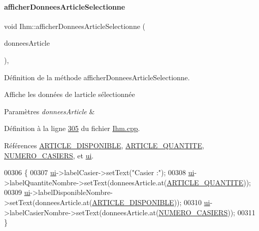 \paragraph{\texorpdfstring{afficher\+Donnees\+Article\+Selectionne}{afficherDonneesArticleSelectionne}\hspace{0.1cm}{\footnotesize\ttfamily [1/2]}}
{\footnotesize\ttfamily void Ihm\+::afficher\+Donnees\+Article\+Selectionne (\begin{DoxyParamCaption}\item[{Q\+String\+List}]{donnees\+Article }\end{DoxyParamCaption})\hspace{0.3cm}{\ttfamily [private]}, {\ttfamily [slot]}}



Définition de la méthode afficher\+Donnees\+Article\+Selectionne. 

Affiche les données de l\textquotesingle{}article sélectionnée 
\begin{DoxyParams}{Paramètres}
{\em donnees\+Article} & \\
\hline
\end{DoxyParams}


Définition à la ligne \hyperlink{_ihm_8cpp_source_l00305}{305} du fichier \hyperlink{_ihm_8cpp_source}{Ihm.\+cpp}.



Références \hyperlink{_ihm_8h_source_l00037}{A\+R\+T\+I\+C\+L\+E\+\_\+\+D\+I\+S\+P\+O\+N\+I\+B\+LE}, \hyperlink{_ihm_8h_source_l00036}{A\+R\+T\+I\+C\+L\+E\+\_\+\+Q\+U\+A\+N\+T\+I\+TE}, \hyperlink{_ihm_8h_source_l00038}{N\+U\+M\+E\+R\+O\+\_\+\+C\+A\+S\+I\+E\+RS}, et \hyperlink{_ihm_8h_source_l00099}{ui}.


\begin{DoxyCode}
00306 \{
00307     \hyperlink{class_ihm_a0ac5f47856566ceeeca1720109bf70ea}{ui}->labelCasier->setText(\textcolor{stringliteral}{"Casier :"});
00308     \hyperlink{class_ihm_a0ac5f47856566ceeeca1720109bf70ea}{ui}->labelQuantiteNombre->setText(donneesArticle.at(\hyperlink{_ihm_8h_ac91f014239536b9bb49d4265ca91d0d5}{ARTICLE\_QUANTITE}));
00309     \hyperlink{class_ihm_a0ac5f47856566ceeeca1720109bf70ea}{ui}->labelDisponibleNombre->setText(donneesArticle.at(\hyperlink{_ihm_8h_a2c5f129a41ff7dac8fa0d97af2d1efd5}{ARTICLE\_DISPONIBLE}));
00310     \hyperlink{class_ihm_a0ac5f47856566ceeeca1720109bf70ea}{ui}->labelCasierNombre->setText(donneesArticle.at(\hyperlink{_ihm_8h_a7935787ef2fa7206f347feff73167ce6}{NUMERO\_CASIERS}));
00311 \}
\end{DoxyCode}
\mbox{\label{class_ihm_af3569c42ee3f9cd38580d01a07212e44}} 
